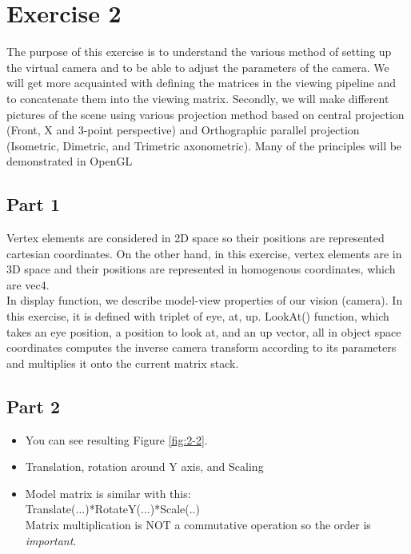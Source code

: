 
\chapter{Exercise 2}
\label{cha:ugeopgave-2}

The purpose of this exercise is to understand the various method of setting up the virtual camera and to be able to adjust the parameters of the camera. We will get more acquainted with defining the matrices in the viewing pipeline and to concatenate them into the viewing matrix. Secondly, we will make different pictures of the scene using various projection method based on central projection (Front, X and 3-point perspective) and Orthographic parallel projection (Isometric, Dimetric, and Trimetric axonometric). Many of the principles will be demonstrated in OpenGL

\section{Part 1}
\label{sec:del-1:-isometri}

Vertex elements are considered in 2D space so their positions are represented cartesian coordinates.
On the other hand, in this exercise, vertex elements are in 3D space and their positions are represented in
homogenous coordinates, which are vec4.\\

In display function, we describe model-view properties of our vision (camera). In this exercise, it is defined with triplet of eye, at, up. LookAt() function, which takes an eye position, a position to look at, and an up vector,
all in object space coordinates computes the inverse camera transform according to its parameters
and multiplies it onto the current matrix stack.

\section{Part 2}
\label{sec:del-2:-viewing}

\begin{itemize}
  \item You can see resulting Figure \ref{fig:2-2}.
  \item Translation, rotation around Y axis, and Scaling
  \item Model matrix is similar with this:\\
      Translate(...)*RotateY(...)*Scale(..)\\
       Matrix multiplication is NOT a commutative operation so the order is \emph{important}.
\end{itemize}



